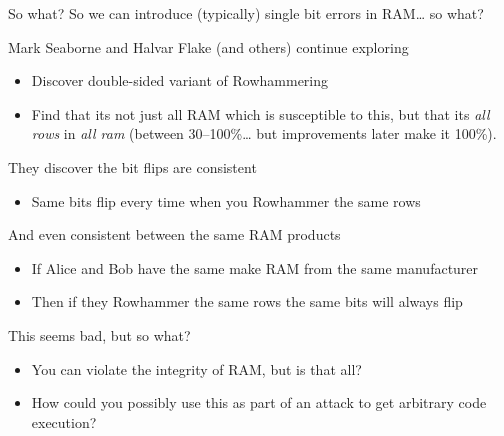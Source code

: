 \documentclass[9pt,aspectratio=169]{beamer}
\begin{document}
\begin{frame}[label={sec:orgd5275c0}]{So what?}
So we can introduce (typically) single bit errors in RAM\ldots{} so what?

\begin{block}{Mark Seaborne and Halvar Flake (and others) continue exploring}
\begin{itemize}
\item Discover double-sided variant of Rowhammering
\item Find that its not just all RAM which is susceptible to this, but that its \emph{all rows} in \emph{all ram} (between 30--100\%\ldots{} but improvements later make it 100\%).
\end{itemize}

They discover the bit flips are consistent
\begin{itemize}
\item Same bits flip every time when you Rowhammer the same rows
\end{itemize}

And even consistent between the same RAM products
\begin{itemize}
\item If Alice and Bob have the same make RAM from the same manufacturer
\item Then if they Rowhammer the same rows the same bits will always flip
\end{itemize}
\end{block}
\end{frame}

\begin{frame}[label={sec:org7c2160c}]{This seems bad, but so what?}
\begin{itemize}
\item You can violate the integrity of RAM, but is that all?
\item How could you possibly use this as part of an attack to get arbitrary code execution?
\end{itemize}
\end{frame}
\end{document}

